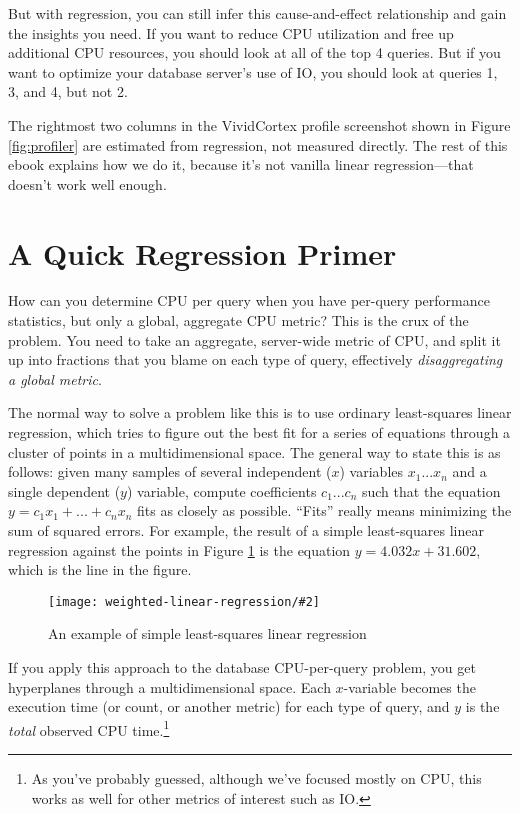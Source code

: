 \documentclass{vivid_layout}
\newcommand{\myfig}[3]{
	\begin{figure}[!htpb]
	\begin{center}
	\rule{0mm}{5mm}
	\texttt{[image: weighted-linear-regression/\#2]}
	\caption{#3}\label{fig:#2}
	\end{center}
	\end{figure}
}
\begin{document}
But with regression, you can still infer this cause-and-effect relationship and gain the insights you need.
If you want to reduce CPU utilization and free up additional CPU resources, you should look at all of the top 4 queries.
But if you want to optimize your database server's use of IO, you should look at queries 1, 3, and 4, but not 2.

The rightmost two columns in the VividCortex profile screenshot shown in Figure \ref{fig:profiler} are estimated from regression, not measured directly. The rest of this ebook explains how we do it, because it's not vanilla linear regression---that doesn't work well enough.

\section{A Quick Regression Primer}

How can you determine CPU per query when you have per-query performance statistics, but only a global, aggregate CPU metric? This is the crux of the problem. You need to take an aggregate, server-wide metric of CPU, and split it up into fractions that you blame on each type of query, effectively \emph{disaggregating a global metric}.

The normal way to solve a problem like this is to use ordinary least-squares linear regression, which tries to figure out the best fit for a series of equations through a cluster of points in a multidimensional space. The general way to state this is as follows: given many samples of several independent ($x$) variables $x_1...x_n$ and a single dependent ($y$) variable, compute coefficients $c_1...c_n$ such that the equation $y = c_1x_1 + ... + c_nx_n$ fits as closely as possible. ``Fits'' really means minimizing the sum of squared errors. For example, the result of a simple least-squares linear regression against the points in Figure \ref{fig:linear-regression} is the equation $y = 4.032x + 31.602$, which is the line in the figure.

\myfig{0.5\textwidth}{linear-regression}{An example of simple least-squares linear regression}

If you apply this approach to the database CPU-per-query problem, you get hyperplanes through a multidimensional space. Each $x$-variable becomes the execution time (or count, or another metric) for each type of query, and $y$ is the \emph{total} observed CPU time.\footnote{As you've probably guessed, although we've focused mostly on CPU, this works as well for other metrics of interest such as IO.}
\end{document}
